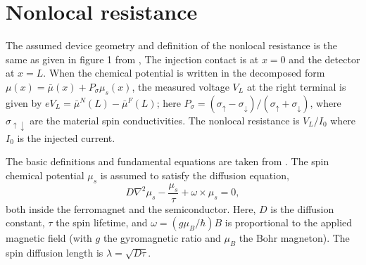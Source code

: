 \section{Nonlocal resistance}

The assumed device geometry and definition of the nonlocal resistance
is the same as given in figure 1 from \cite{PhysRevB.67.052409},
The injection contact is at $x = 0$ and the detector at $x = L$.
When the chemical potential is written in the decomposed form
$μ(x) = \bar{μ} (x) + P_σ μ_s(x)$,
the measured voltage $V_L$ at the right terminal is given by
$e V_L = \bar{μ}^N (L) - \bar{μ}^F (L)$;
here $P_σ = \left( σ_↑ - σ_↓ \right) / \left( σ_↑ + σ_↓ \right)$,
where $σ_{↑↓}$ are the material spin conductivities.
The nonlocal resistance is $V_L / I_0$ where $I_0$ is the injected current.

The basic definitions and fundamental equations are taken from
\cite{ActaPhysicaSlovaca.57.4_5.565-907}.
The spin chemical potential $μ_s$ is assumed to satisfy the diffusion equation,
\begin{equation}
  D ∇^2 μ_s - \frac{μ_s}{τ} + ω × μ_s = 0 ,
\end{equation}
both inside the ferromagnet and the semiconductor.
Here, $D$ is the diffusion constant, $τ$ the spin lifetime,
and $ω = \left( g μ_B / ℏ \right) B$ is proportional to the applied magnetic field
(with $g$ the gyromagnetic ratio and $μ_B$ the Bohr magneton).
The spin diffusion length is $λ = \sqrt{D τ}$.

